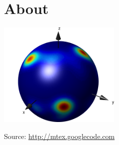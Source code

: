 \section{About}

\begin{frame}[plain]

  \author{}
  \date{}
  \institute{}
  \titlegraphic{}
  \maketitle

  \vskip -2cm

  \centerline{\includegraphics[height=5cm]{pic/pdf3d3.png}}

  \begin{block}{Source:}
    \url{http://mtex.googlecode.com}
  \end{block}

\end{frame}


